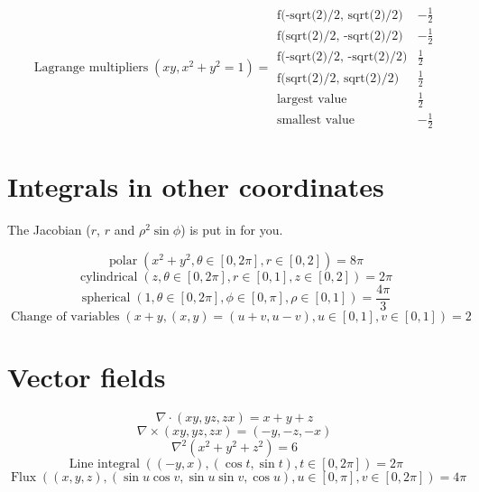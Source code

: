 \documentclass[11pt,a4paper]{article}
\theoremstyle{plain}
\theoremstyle{definition}
\theoremstyle{remark}
\begin{document}
\begin{align*}
  \operatorname{Lagrange\ multipliers}(x y, x^2 + y^2 = 1) = \begin{array}{ll} \text{f(-sqrt(2)/2, sqrt(2)/2)} & -\frac{1}{2} \\ \text{f(sqrt(2)/2, -sqrt(2)/2)} & -\frac{1}{2} \\ \text{f(-sqrt(2)/2, -sqrt(2)/2)} & \frac{1}{2} \\ \text{f(sqrt(2)/2, sqrt(2)/2)} & \frac{1}{2} \\ \text{largest value} & \frac{1}{2} \\ \text{smallest value} & -\frac{1}{2} \end{array}
\end{align*}
\section*{Integrals in other coordinates}

The Jacobian ($r$, $r$ and $\rho^2 \sin\phi$) is put in for you.

\begin{equation*}
  \operatorname{polar}(x^2 + y^2, \theta \in [0, 2\pi], r \in [0, 2]) = 8 \pi
\end{equation*}
\begin{equation*}
  \operatorname{cylindrical}(z, \theta \in [0, 2\pi], r \in [0, 1], z \in [0, 2]) = 2 \pi
\end{equation*}
\begin{equation*}
  \operatorname{spherical}(1, \theta \in [0, 2\pi], \phi \in [0, \pi], \rho \in [0, 1]) = \frac{4 \pi}{3}
\end{equation*}
\begin{equation*}
  \operatorname{Change\ of\ variables}(x + y, (x, y) = (u + v, u - v), u \in [0, 1], v \in [0, 1]) = 2
\end{equation*}
\section*{Vector fields}

\begin{equation*}
  \nabla \cdot (x y, y z, z x) = x + y + z
\end{equation*}
\begin{equation*}
  \nabla \times (x y, y z, z x) = \left(-y, -z, -x\right)
\end{equation*}
\begin{equation*}
  \nabla^2 (x^2 + y^2 + z^2) = 6
\end{equation*}
\begin{equation*}
  \operatorname{Line\ integral}((-y, x), (\cos t, \sin t), t \in [0, 2\pi]) = 2 \pi
\end{equation*}
\begin{equation*}
  \operatorname{Flux}((x, y, z), (\sin u \cos v, \sin u \sin v, \cos u), u \in [0, \pi], v \in [0, 2\pi]) = 4 \pi
\end{equation*}
\end{document}

